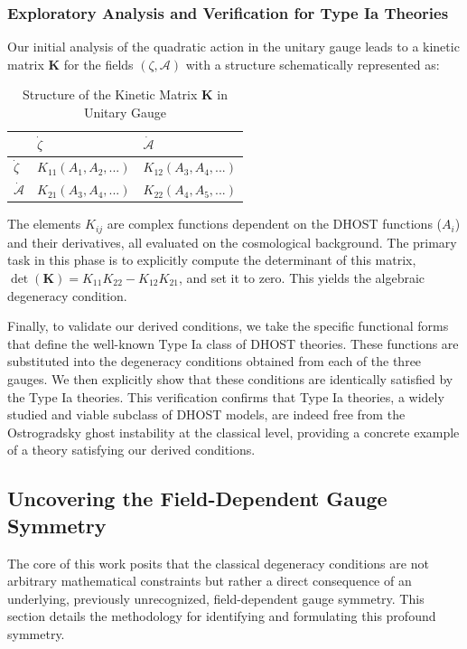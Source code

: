 \documentclass[twocolumn]{aastex631}
\begin{document}
\subsubsection{Exploratory Analysis and Verification for Type Ia Theories}
Our initial analysis of the quadratic action in the unitary gauge leads to a kinetic matrix $\mathbf{K}$ for the fields $(\zeta, \mathcal{A})$ with a structure schematically represented as:
\begin{table}[h!]
\centering
\caption{Structure of the Kinetic Matrix $\mathbf{K}$ in Unitary Gauge}
\begin{tabular}{l|ll}
\hline
 & $\dot{\zeta}$ & $\dot{\mathcal{A}}$ \\ \hline
$\dot{\zeta}$ & $K_{11}(A_1, A_2, ...)$ & $K_{12}(A_3, A_4, ...)$ \\
$\dot{\mathcal{A}}$ & $K_{21}(A_3, A_4, ...)$ & $K_{22}(A_4, A_5, ...)$ \\ \hline
\end{tabular}
\end{table}
The elements $K_{ij}$ are complex functions dependent on the DHOST functions ($A_i$) and their derivatives, all evaluated on the cosmological background. The primary task in this phase is to explicitly compute the determinant of this matrix, $\det(\mathbf{K}) = K_{11}K_{22} - K_{12}K_{21}$, and set it to zero. This yields the algebraic degeneracy condition.

Finally, to validate our derived conditions, we take the specific functional forms that define the well-known Type Ia class of DHOST theories. These functions are substituted into the degeneracy conditions obtained from each of the three gauges. We then explicitly show that these conditions are identically satisfied by the Type Ia theories. This verification confirms that Type Ia theories, a widely studied and viable subclass of DHOST models, are indeed free from the Ostrogradsky ghost instability at the classical level, providing a concrete example of a theory satisfying our derived conditions.

\subsection{Uncovering the Field-Dependent Gauge Symmetry}

The core of this work posits that the classical degeneracy conditions are not arbitrary mathematical constraints but rather a direct consequence of an underlying, previously unrecognized, field-dependent gauge symmetry. This section details the methodology for identifying and formulating this profound symmetry.
\end{document}
